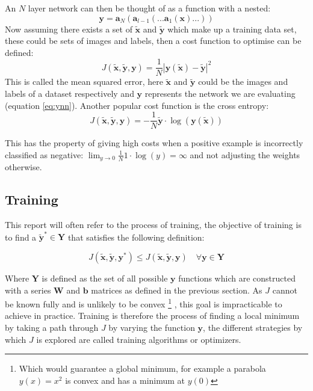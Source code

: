     An $N$ layer network can then be thought of as a function with a nested:
    \begin{equation} \label{eq:ynn}
      \mathbf{y} = \mathbf{a}_{N}(\mathbf{a}_{l-1}(...\mathbf{a}_1(\mathbf{x})...))
    \end{equation}
    Now assuming there exists a set of $\tilde{\mathbf{x}}$ and $\tilde{\mathbf{y}}$ which make
    up a training data set, these could be sets of images and labels, then a cost function
    to optimise can be defined:
    \begin{equation}
      J(\tilde{\mathbf{x}},\tilde{\mathbf{y}},\mathbf{y}) = \frac{1}{N}\left |\mathbf{y}(\tilde{\mathbf{x}})-\tilde{\mathbf{y}}\right | ^2
    \end{equation}
    This is called the mean squared error, here $\tilde{\mathbf{x}}$ and $\tilde{\mathbf{y}}$ could
    be the images and labels of a dataset respectively and $\mathbf{y}$ represents the network we are evaluating (equation \ref{eq:ynn}). Another popular cost function is
    the cross entropy:
    \begin{equation}
      J(\tilde{\mathbf{x}},\tilde{\mathbf{y}},\mathbf{y}) = -\frac{1}{N}\tilde{\mathbf{y}}\cdot\log(\mathbf{y}(\tilde{\mathbf{x}}))
    \end{equation}

    This has the property of giving high costs when a positive example is incorrectly classified as negative: $\lim _{y\rightarrow0}\frac{1}{N}1\cdot \log(y) = \infty$
    and not adjusting the weights otherwise.

  \subsection{Training}
      This report will often refer to the process of training, the objective of training is to find
      a $\tilde{\mathbf{y}}^* \in \mathbf{Y}$ that satisfies the following definition:

      \begin{equation}
        J(\tilde{\mathbf{x}},\tilde{\mathbf{y}},\mathbf{y}^*) \leq J(\tilde{\mathbf{x}},\tilde{\mathbf{y}},\mathbf{y}) \quad \forall \mathbf{y} \in \mathbf{Y}
      \end{equation}

      Where $\mathbf{Y}$ is defined as the set of all possible $\mathbf{y}$ functions which are constructed with a series $\mathbf{W}$ and $\mathbf{b}$ matrices as defined in the previous section.
      As $J$ cannot be known fully and is unlikely to be convex \footnote{Which would guarantee a global minimum, for example a parabola $y(x)=x^2$ is convex and has a minimum at $y(0)$}
      , this goal is impracticable to achieve in practice.
      Training is therefore the process of finding a local minimum by taking a path through $J$ by varying
      the function $ \mathbf{y} $, the different strategies by which $J$ is explored are called
      training algorithms or optimizers.

